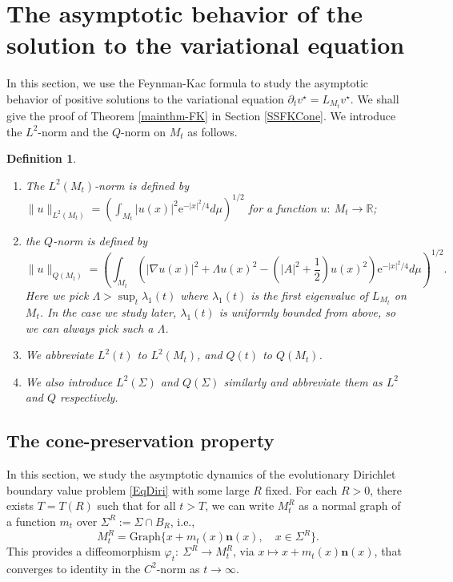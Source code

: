 \documentclass[12pt]{amsart}
\numberwithin{equation}{section}
\newtheorem{definition}[theorem]{Definition}
\numberwithin{equation}{section}
\newcommand{\bn}{\mathbf{n}}
\newcommand{\R}{\mathbb{R}}
\begin{document}
	\section{The asymptotic behavior of the solution to the variational equation}\label{S:Asymvariation}
	In this section, we use the Feynman-Kac formula to study the asymptotic behavior of positive solutions to the variational equation $\partial_t v^\star=L_{M_t}v^\star$. We shall give the proof of Theorem \ref{mainthm-FK} in Section \ref{SSFKCone}.
	We introduce the  $L^2$-norm and the $Q$-norm  on $M_t$ as follows. 
	
	\begin{definition}
		\begin{enumerate}
			\item The $L^2(M_t)$-norm is defined by
			$\|u\|_{L^2(M_t)}=\left(\int_{M_t} |u(x)|^2  \mathrm{e}^{-|x|^2/4} d\mu\right)^{1/2}$ for a function $u:\ M_t\to\R$;
			\item the $Q$-norm is defined by 
			$$\|u\|_{Q(M_t)}=\left(\int_{M_t} \left(|\nabla u(x)|^2+ \Lambda u(x)^2- (|A|^2+\frac12)u(x)^2\right)  \mathrm{e}^{-|x|^2/4} d\mu\right)^{1/2}.$$
			Here we pick $\Lambda> \sup_t\lambda_1(t)$ where $\lambda_1(t)$ is the first eigenvalue of $L_{M_t}$ on $M_t$. In the case we study later, $\lambda_1(t)$ is uniformly bounded from above, so we can always pick such a $\Lambda$. 
			\item We abbreviate $L^2(t)$ to $L^2(M_t)$, and $Q(t)$ to $Q(M_t)$.
			\item We also introduce $L^2(\Sigma)$ and $Q(\Sigma)$ similarly and abbreviate them as $L^2$ and $Q$ respectively. 
		\end{enumerate}
	\end{definition}
	
	
	
	\subsection{The cone-preservation property}\label{SSConeLinear}
	In this section, we study the asymptotic dynamics of the evolutionary Dirichlet boundary value problem \eqref{EqDiri} with some large $R$ fixed. For each $R>0$, there exists $T=T(R)$ such that for all $t>T$, we can write $M_t^R$ as a normal graph of a function $m_t$ over $\Sigma^R:=\Sigma \cap B_R$, i.e., 
	$$M_t^R=\mathrm{Graph}\{x+m_t(x)\bn(x),\quad x\in \Sigma^R\}. $$
	This provides a diffeomorphism $\varphi_t:\ \Sigma^R\to M_t^R$,  via $x\mapsto x+m_t(x)\bn(x)$,  that converges to identity in the $C^2$-norm as $t\to\infty$.
	
\end{document}
